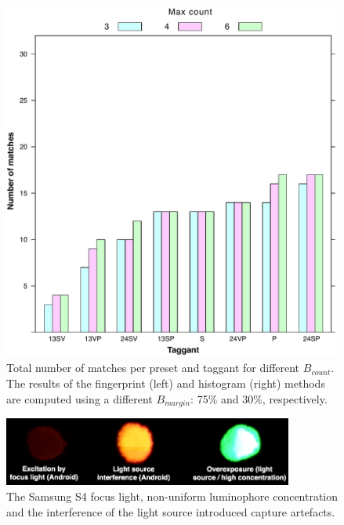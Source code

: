 \documentclass[thesis.tex]{subfiles}
\begin{document}
\begin{figure}[t]
\centering \includegraphics[page=7,width=0.99\textwidth,height=\textheight,keepaspectratio=true]{images/experiment/tags_configs}
\vspace{-3mm}
\caption{Total number of matches per preset and taggant for different $B_{count}$. The results of the fingerprint (left) and histogram (right) methods are computed using a different $B_{margin}$: 75\% and 30\%, respectively.}
\label{figure:tags_presets}
\end{figure}

\begin{figure}[b]
\centering \includegraphics[page=2,width=0.85\textwidth,height=\textheight,keepaspectratio=true]{images/experiment/artefacts}
\vspace{-3mm}
\caption{The Samsung S4 focus light, non-uniform luminophore concentration and the interference of the light source introduced capture artefacts.}
\label{figure:artefacts}
\end{figure}
\end{document}
